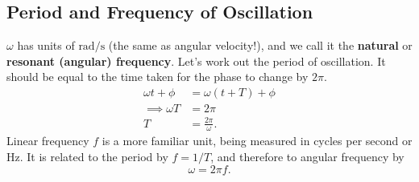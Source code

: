 \documentclass[../classical_mechanics.tex]{subfiles}
\begin{document}
        \subsection{Period and Frequency of Oscillation}\label{subsec:period-and-frequency-of-oscillation}
            $\omega$ has units of $\unit{\radian\per\second}$ (the same as angular velocity!), and we call it the \textbf{natural} or \textbf{resonant (angular) frequency}.
            Let's work out the period of oscillation.
            It should be equal to the time taken for the phase to change by $2\pi$.
            \begin{align}
                \omega t+\phi&=\omega(t+T)+\phi\\
                \implies\omega T&=2\pi\\
                T&=\frac{2\pi}{\omega}.
            \end{align}
            Linear frequency $f$ is a more familiar unit, being measured in cycles per second or \unit{\hertz}.
            It is related to the period by $f=1/T$, and therefore to angular frequency by
            \begin{equation}
                \omega=2\pi f.
            \end{equation}
        
\end{document}
